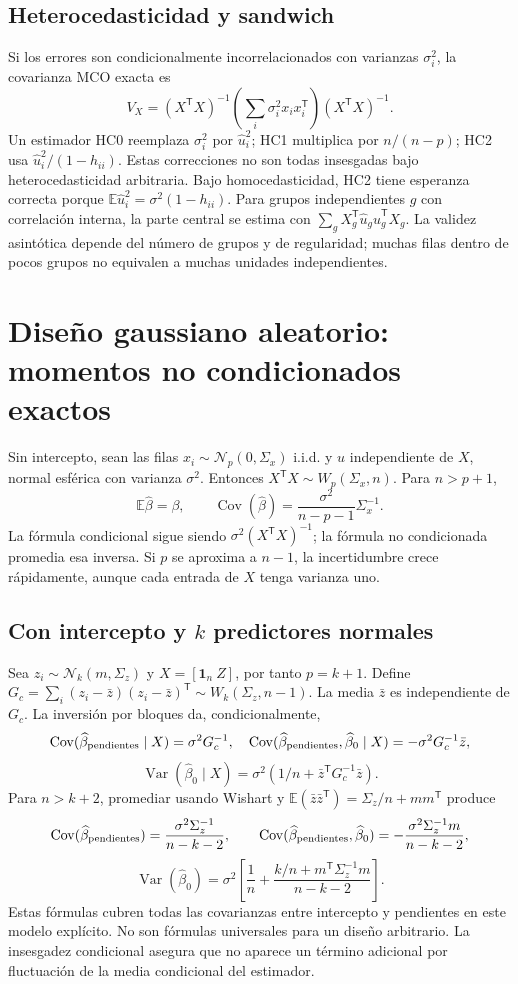 \documentclass[11pt,a4paper]{article}
\newcommand{\E}{\mathbb E}
\newcommand{\T}{^{\mathsf T}}
\DeclareMathOperator{\Var}{Var}
\DeclareMathOperator{\Cov}{Cov}
\newcommand{\ones}{\mathbf 1}
\theoremstyle{definition}
\begin{document}
\subsection{Heterocedasticidad y sandwich}
Si los errores son condicionalmente incorrelacionados con varianzas $\sigma_i^2$, la covarianza MCO exacta es
\[
V_X=(X\T X)^{-1}\left(\sum_i\sigma_i^2x_ix_i\T\right)(X\T X)^{-1}.
\]
Un estimador HC0 reemplaza $\sigma_i^2$ por $\widehat u_i^2$; HC1 multiplica por $n/(n-p)$; HC2 usa $\widehat u_i^2/(1-h_{ii})$. Estas correcciones no son todas insesgadas bajo heterocedasticidad arbitraria. Bajo homocedasticidad, HC2 tiene esperanza correcta porque $\E\widehat u_i^2=\sigma^2(1-h_{ii})$.
Para grupos independientes $g$ con correlación interna, la parte central se estima con $\sum_g X_g\T\widehat u_g\widehat u_g\T X_g$. La validez asintótica depende del número de grupos y de regularidad; muchas filas dentro de pocos grupos no equivalen a muchas unidades independientes.

\section{Diseño gaussiano aleatorio: momentos no condicionados exactos}
Sin intercepto, sean las filas $x_i\sim\mathcal N_p(0,\Sigma_x)$ i.i.d. y $u$ independiente de $X$, normal esférica con varianza $\sigma^2$. Entonces $X\T X\sim W_p(\Sigma_x,n)$. Para $n>p+1$,
\[
\E\widehat\beta=\beta,\qquad
\boxed{\Cov(\widehat\beta)=\frac{\sigma^2}{n-p-1}\Sigma_x^{-1}}.
\]
La fórmula condicional sigue siendo $\sigma^2(X\T X)^{-1}$; la fórmula no condicionada promedia esa inversa. Si $p$ se aproxima a $n-1$, la incertidumbre crece rápidamente, aunque cada entrada de $X$ tenga varianza uno.
\subsection{Con intercepto y $k$ predictores normales}
Sea $z_i\sim\mathcal N_k(m,\Sigma_z)$ y $X=[\ones_n\ Z]$, por tanto $p=k+1$. Define $G_c=\sum_i(z_i-\bar z)(z_i-\bar z)\T\sim W_k(\Sigma_z,n-1)$. La media $\bar z$ es independiente de $G_c$. La inversión por bloques da, condicionalmente,
\[
\Cov(\widehat\beta_{\rm pendientes}\mid X)=\sigma^2G_c^{-1},\quad
\Cov(\widehat\beta_{\rm pendientes},\widehat\beta_0\mid X)=-\sigma^2G_c^{-1}\bar z,
\]
\[
\Var(\widehat\beta_0\mid X)=\sigma^2(1/n+\bar z\T G_c^{-1}\bar z).
\]
Para $n>k+2$, promediar usando Wishart y $\E(\bar z\bar z\T)=\Sigma_z/n+mm\T$ produce
\[
\Cov(\widehat\beta_{\rm pendientes})=\frac{\sigma^2\Sigma_z^{-1}}{n-k-2},\qquad
\Cov(\widehat\beta_{\rm pendientes},\widehat\beta_0)=-\frac{\sigma^2\Sigma_z^{-1}m}{n-k-2},
\]
\[
\Var(\widehat\beta_0)=\sigma^2\left[\frac1n+
\frac{k/n+m\T\Sigma_z^{-1}m}{n-k-2}\right].
\]
Estas fórmulas cubren todas las covarianzas entre intercepto y pendientes en este modelo explícito. No son fórmulas universales para un diseño arbitrario. La insesgadez condicional asegura que no aparece un término adicional por fluctuación de la media condicional del estimador.
\end{document}
